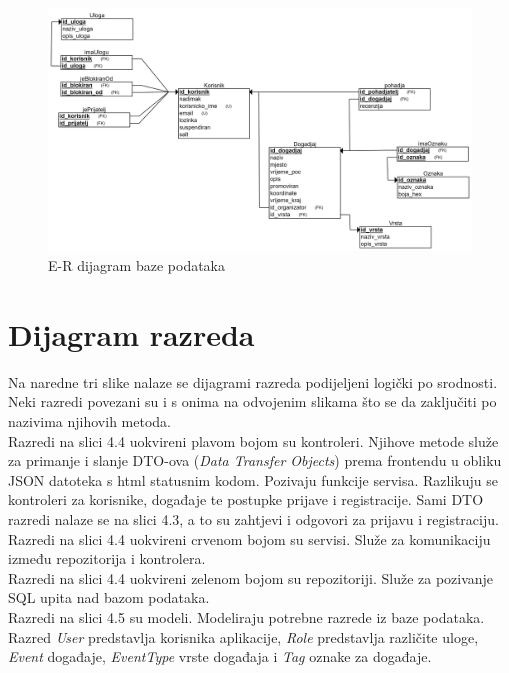 				
			\begin{figure}[h]
				\includegraphics[width=\textwidth]{dijagrami/Baza podataka/REL shema.png}
				\caption{E-R dijagram baze podataka}
			\end{figure}
				
			\eject
			
			
		\section{Dijagram razreda}
			
			\indent Na naredne tri slike nalaze se dijagrami razreda podijeljeni logički po srodnosti. Neki razredi povezani su i s onima na odvojenim slikama što se da zaključiti po nazivima njihovih metoda. \\
			
			\indent Razredi na slici 4.4 uokvireni plavom bojom su kontroleri. Njihove metode služe za primanje i slanje DTO-ova (\textit{Data Transfer Objects})  prema frontendu u obliku JSON datoteka s html statusnim kodom. Pozivaju funkcije servisa. Razlikuju se kontroleri za korisnike, događaje te postupke prijave i registracije. Sami DTO razredi nalaze se na slici 4.3, a to su zahtjevi i odgovori za prijavu i registraciju.\\
			
			\indent Razredi na slici 4.4 uokvireni crvenom bojom su servisi. Služe za komunikaciju između repozitorija i kontrolera.\\
			
			\indent Razredi na slici 4.4 uokvireni zelenom bojom su repozitoriji. Služe za pozivanje SQL upita nad bazom podataka.\\
			
			\indent Razredi na slici 4.5 su modeli. Modeliraju potrebne razrede iz baze podataka. Razred \textit{User} predstavlja korisnika aplikacije, \textit{Role} predstavlja različite uloge, \textit{Event} događaje, \textit{EventType} vrste događaja i \textit{Tag} oznake za događaje.
			
